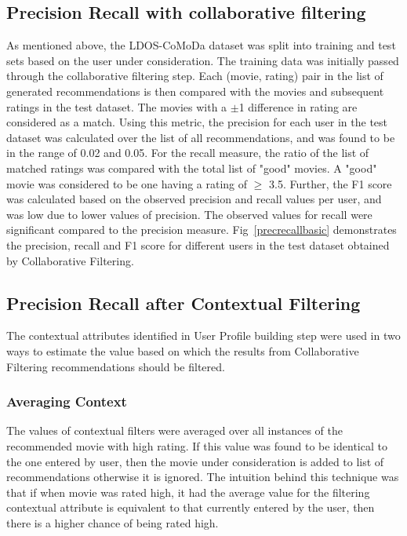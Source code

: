 \documentclass{article}
\begin{document}
\subsection{Precision Recall with collaborative filtering}
 As mentioned above, the LDOS-CoMoDa dataset was split into training and test sets based on the user under consideration. The training data was initially passed through the collaborative filtering step. Each (movie, rating) pair in the list of generated recommendations is then compared with the movies and subsequent ratings in the test dataset. The movies with a $\pm$1 difference in rating are considered as a match. Using this metric, the precision for each user in the test dataset was calculated over the list of all recommendations, and was found to be in the range of 0.02 and 0.05. For the recall measure, the ratio of the list of matched ratings was compared with the total list of "good" movies. A "good" movie was considered to be one having a rating of $\ge$ 3.5. Further, the F1 score was calculated based on the observed precision and recall values per user, and was low due to lower values of precision. The observed values for recall were significant compared to the precision measure. Fig~\ref{precrecallbasic} demonstrates the precision, recall and F1 score for different users in the test dataset obtained by Collaborative Filtering.
 
\subsection{Precision Recall after Contextual Filtering}

The contextual attributes identified in User Profile building step were used in two ways to estimate the value based on which the results from Collaborative Filtering recommendations should be filtered. 

\subsubsection{Averaging Context}

The values of contextual filters were averaged over all instances of the recommended movie with high rating. If this value was found to be identical to the one entered by user, then the movie under consideration is added to list of recommendations otherwise it is ignored. The intuition behind this technique was that if when movie was rated high, it had the average value for the filtering contextual attribute is equivalent to that currently entered by the user, then there is a higher chance of being rated high. \\
\end{document}
